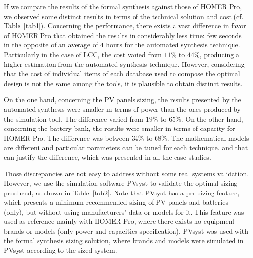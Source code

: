 \documentclass[journal]{IEEEtran}
\begin{document}
%
If we compare the results of the formal synthesis against those of HOMER Pro, we observed some distinct results in terms of the technical solution and cost (cf. Table~\ref{tab1}). Concerning the performance, there exists a vast difference in favor of HOMER Pro that obtained the results in considerably less time: few seconds in the opposite of an average of $4$ hours for the automated synthesis technique.
%
Particularly in the case of LCC, the cost varied from $11$\% to $44$\%, producing a higher estimation from the automated synthesis technique. However, considering that the cost of individual items of each database used to compose the optimal design is not the same among the tools, it is plausible to obtain distinct results.

On the one hand, concerning the PV panels sizing, the results presented by the automated synthesis were smaller in terms of power than the ones produced by the simulation tool. The difference varied from $19$\% to $65$\%. On the other hand, concerning the battery bank, the results were smaller in terms of capacity for HOMER Pro. The difference was between $34$\% to $68$\%. The mathematical models are different and particular parameters can be tuned for each technique, and that can justify the difference, which was presented in all the case studies.

Those discrepancies are not easy to address without some real systems validation. However, we use the simulation software PVsyst to validate the optimal sizing produced, as shown in Table~\ref{tab2}. Note that PVsyst has a pre-sizing feature, which presents a minimum recommended sizing of PV panels and batteries (only), but without using manufacturers' data or models for it. This feature was used as reference mainly with HOMER Pro, where there exists no equipment brands or models (only power and capacities specification). PVsyst was used with the formal synthesis sizing solution, where brands and models were simulated in PVsyst according to the sized system.
\end{document}
